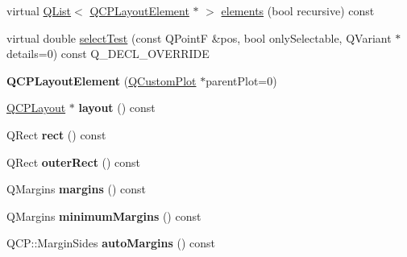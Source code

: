 \begin{DoxyCompactItemize}
\item 
virtual \hyperlink{class_q_list}{Q\+List}$<$ \hyperlink{class_q_c_p_layout_element}{Q\+C\+P\+Layout\+Element} $\ast$ $>$ \hyperlink{class_q_c_p_layout_element_a311d60d78e62ef8eaaedb1b6ceb9e788}{elements} (bool recursive) const 
\item 
virtual double \hyperlink{class_q_c_p_layout_element_ae97f483cccedadbf18ea4525ef240ee4}{select\+Test} (const Q\+PointF \&pos, bool only\+Selectable, Q\+Variant $\ast$details=0) const Q\+\_\+\+D\+E\+C\+L\+\_\+\+O\+V\+E\+R\+R\+I\+DE
\item 
{\bfseries Q\+C\+P\+Layout\+Element} (\hyperlink{class_q_custom_plot}{Q\+Custom\+Plot} $\ast$parent\+Plot=0)\hypertarget{class_q_c_p_layout_element_a8947f0ada17e672aaba3d424cbbb67e3}{}\label{class_q_c_p_layout_element_a8947f0ada17e672aaba3d424cbbb67e3}

\item 
\hyperlink{class_q_c_p_layout}{Q\+C\+P\+Layout} $\ast$ {\bfseries layout} () const \hypertarget{class_q_c_p_layout_element_ab1c0df9a381cc244f975188d73e28527}{}\label{class_q_c_p_layout_element_ab1c0df9a381cc244f975188d73e28527}

\item 
Q\+Rect {\bfseries rect} () const \hypertarget{class_q_c_p_layout_element_affdfea003469aac3d0fac5f4e06171bc}{}\label{class_q_c_p_layout_element_affdfea003469aac3d0fac5f4e06171bc}

\item 
Q\+Rect {\bfseries outer\+Rect} () const \hypertarget{class_q_c_p_layout_element_a60bbddee2d1230c2414bd776f44d17b8}{}\label{class_q_c_p_layout_element_a60bbddee2d1230c2414bd776f44d17b8}

\item 
Q\+Margins {\bfseries margins} () const \hypertarget{class_q_c_p_layout_element_a85ff977dfcced84eef32d9f819ec9543}{}\label{class_q_c_p_layout_element_a85ff977dfcced84eef32d9f819ec9543}

\item 
Q\+Margins {\bfseries minimum\+Margins} () const \hypertarget{class_q_c_p_layout_element_a60ec7f377c26726174d536bffb632002}{}\label{class_q_c_p_layout_element_a60ec7f377c26726174d536bffb632002}

\item 
Q\+C\+P\+::\+Margin\+Sides {\bfseries auto\+Margins} () const \hypertarget{class_q_c_p_layout_element_a2f499b1179b3126e22d0d7508124ccb3}{}\label{class_q_c_p_layout_element_a2f499b1179b3126e22d0d7508124ccb3}


\end{DoxyCompactItemize}
